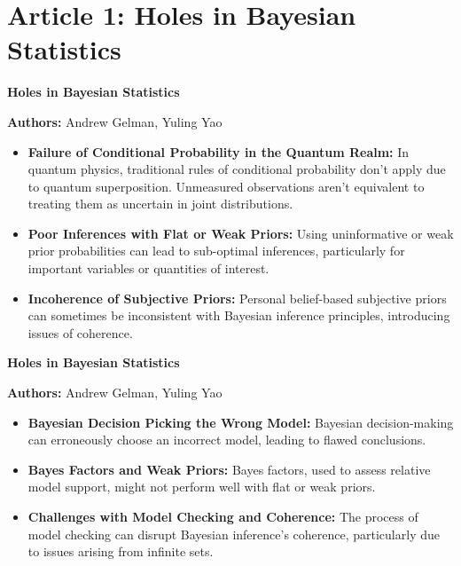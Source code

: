 \documentclass[dvipsnames,mathserif]{beamer}
\begin{document}
{\section{Article 1: Holes in Bayesian Statistics}
\fontsize{11}{15}\selectfont
    \begin{frame}
    \begin{center}
    \large \textbf{Holes in Bayesian Statistics}\\
    \end{center}
    \footnotesize
      \textbf{Authors:} Andrew Gelman, Yuling Yao\\
          \begin{itemize}
              \item \textbf{Failure of Conditional Probability in the Quantum Realm:} In quantum physics, traditional rules of conditional probability don't apply due to quantum superposition. Unmeasured observations aren't equivalent to treating them as uncertain in joint distributions.
              \item \textbf{Poor Inferences with Flat or Weak Priors:} Using uninformative or weak prior probabilities can lead to sub-optimal inferences, particularly for important variables or quantities of interest.
               \item \textbf{Incoherence of Subjective Priors:} Personal belief-based subjective priors can sometimes be inconsistent with Bayesian inference principles, introducing issues of coherence.
          \end{itemize}
      \end{frame}  
\begin{frame}
    \begin{center}
    \large \textbf{Holes in Bayesian Statistics}\\
    \end{center}
    \footnotesize
      \textbf{Authors:} Andrew Gelman, Yuling Yao\\
          \begin{itemize}
              \item \textbf{Bayesian Decision Picking the Wrong Model:} Bayesian decision-making can erroneously choose an incorrect model, leading to flawed conclusions.
              \item \textbf{Bayes Factors and Weak Priors:} Bayes factors, used to assess relative model support, might not perform well with flat or weak priors.
              \item \textbf{Challenges with Model Checking and Coherence:} The process of model checking can disrupt Bayesian inference's coherence, particularly due to issues arising from infinite sets.
          \end{itemize}
      \end{frame}  

}
\end{document}
